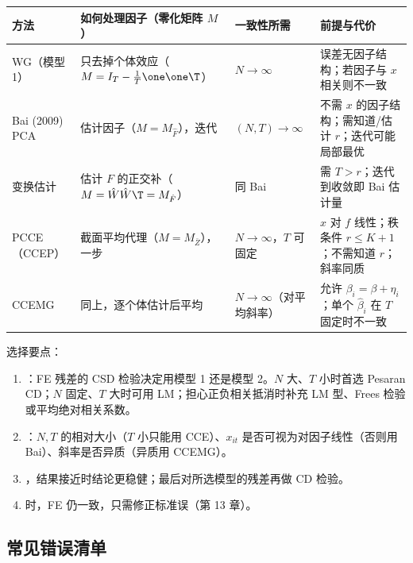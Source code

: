 \begin{center}
\small
\begin{tabularx}{\linewidth}{>{\raggedright\arraybackslash}p{2.3cm}>{\raggedright\arraybackslash}p{3.7cm}>{\raggedright\arraybackslash}p{2.7cm}L}
\toprule
方法 & 如何处理因子（零化矩阵 $M$） & 一致性所需 & 前提与代价\\
\midrule
WG（模型 1） & 只去掉个体效应（$M=I_T-\frac1T\one\one\T$） & $N\to\infty$ & 误差无因子结构；若因子与 $x$ 相关则不一致\\
Bai (2009) PCA & 估计因子（$M=M_{\hat F}$），迭代 & $(N,T)\to\infty$ & 不需 $x$ 的因子结构；需知道/估计 $r$；迭代可能局部最优\\
变换估计 & 估计 $F$ 的正交补（$M=\hat W\hat W\T=M_{\hat F}$） & 同 Bai & 需 $T>r$；迭代到收敛即 Bai 估计量\\
PCCE（CCEP） & 截面平均代理（$M=M_{\bar Z}$），一步 & $N\to\infty$，$T$ 可固定 & $x$ 对 $f$ 线性；秩条件 $r\le K+1$；不需知道 $r$；斜率同质\\
CCEMG & 同上，逐个体估计后平均 & $N\to\infty$（对平均斜率） & 允许 $\beta_i=\beta+\eta_i$；单个 $\hat\beta_i$ 在 $T$ 固定时不一致\\
\bottomrule
\end{tabularx}
\label{tab:U14b-methods}
\end{center}

选择要点：
\begin{enumerate}
  \item {}：FE 残差的 CSD 检验决定用模型 1 还是模型 2。$N$ 大、$T$ 小时首选 Pesaran CD；$N$ 固定、$T$ 大时可用 LM；担心正负相关抵消时补充 LM 型、Frees 检验或平均绝对相关系数。
  \item {}：$N,T$ 的相对大小（$T$ 小只能用 CCE）、$x_{it}$ 是否可视为对因子线性（否则用 Bai）、斜率是否异质（异质用 CCEMG）。
  \item {}，结果接近时结论更稳健；最后对所选模型的残差再做 CD 检验。
  \item {}时，FE 仍一致，只需修正标准误（第 13 章）。
\end{enumerate}

\subsection{常见错误清单}


